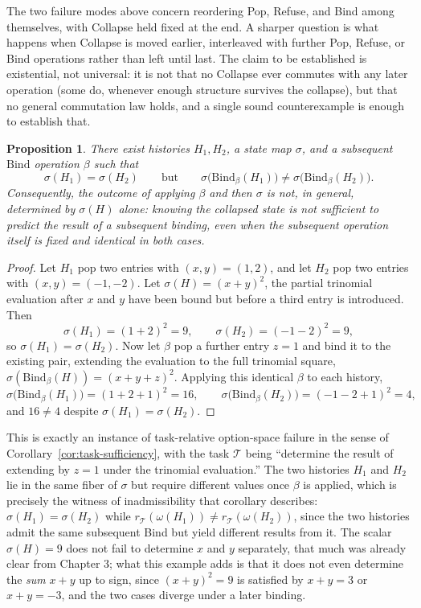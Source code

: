 \documentclass[11pt]{book}
\newtheorem{proposition}[theorem]{Proposition}
\begin{document}
The two failure modes above concern reordering Pop, Refuse, and Bind among themselves, with Collapse held fixed at the end. A sharper question is what happens when Collapse is moved earlier, interleaved with further Pop, Refuse, or Bind operations rather than left until last. The claim to be established is existential, not universal: it is not that no Collapse ever commutes with any later operation (some do, whenever enough structure survives the collapse), but that no general commutation law holds, and a single sound counterexample is enough to establish that.

\begin{proposition}
\label{prop:collapse-noncommute}
There exist histories $H_1,H_2$, a state map $\sigma$, and a subsequent $\mathrm{Bind}$ operation $\beta$ such that
\[
\sigma(H_1)=\sigma(H_2) \qquad\text{but}\qquad \sigma\bigl(\mathrm{Bind}_\beta(H_1)\bigr) \ne \sigma\bigl(\mathrm{Bind}_\beta(H_2)\bigr).
\]
Consequently, the outcome of applying $\beta$ and then $\sigma$ is not, in general, determined by $\sigma(H)$ alone: knowing the collapsed state is not sufficient to predict the result of a subsequent binding, even when the subsequent operation itself is fixed and identical in both cases.
\end{proposition}
\begin{proof}
Let $H_1$ pop two entries with $(x,y)=(1,2)$, and let $H_2$ pop two entries with $(x,y)=(-1,-2)$. Let $\sigma(H)=(x+y)^2$, the partial trinomial evaluation after $x$ and $y$ have been bound but before a third entry is introduced. Then
\[
\sigma(H_1) = (1+2)^2 = 9, \qquad \sigma(H_2) = (-1-2)^2 = 9,
\]
so $\sigma(H_1)=\sigma(H_2)$. Now let $\beta$ pop a further entry $z=1$ and bind it to the existing pair, extending the evaluation to the full trinomial square, $\sigma(\mathrm{Bind}_\beta(H)) = (x+y+z)^2$. Applying this identical $\beta$ to each history,
\[
\sigma\bigl(\mathrm{Bind}_\beta(H_1)\bigr) = (1+2+1)^2 = 16, \qquad \sigma\bigl(\mathrm{Bind}_\beta(H_2)\bigr) = (-1-2+1)^2 = 4,
\]
and $16\ne4$ despite $\sigma(H_1)=\sigma(H_2)$.
\end{proof}

This is exactly an instance of task-relative option-space failure in the sense of Corollary~\ref{cor:task-sufficiency}, with the task $\mathcal T$ being ``determine the result of extending by $z=1$ under the trinomial evaluation.'' The two histories $H_1$ and $H_2$ lie in the same fiber of $\sigma$ but require different values once $\beta$ is applied, which is precisely the witness of inadmissibility that corollary describes: $\sigma(H_1)=\sigma(H_2)$ while $r_{\mathcal T}(\omega(H_1))\ne r_{\mathcal T}(\omega(H_2))$, since the two histories admit the same subsequent Bind but yield different results from it. The scalar $\sigma(H)=9$ does not fail to determine $x$ and $y$ separately, that much was already clear from Chapter 3; what this example adds is that it does not even determine the \emph{sum} $x+y$ up to sign, since $(x+y)^2=9$ is satisfied by $x+y=3$ or $x+y=-3$, and the two cases diverge under a later binding.
\end{document}
